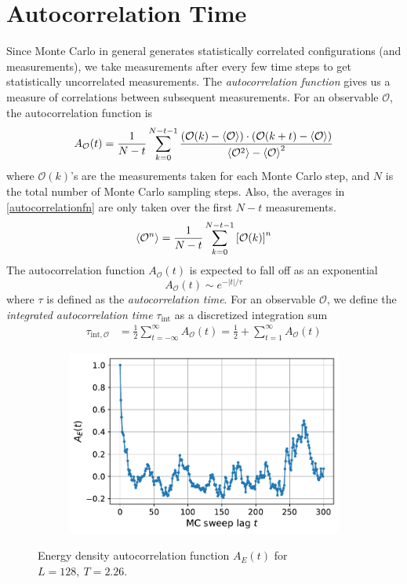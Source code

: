 \documentclass[../journal_main.tex]{subfiles}
\begin{document}
\section{Autocorrelation Time}
Since Monte Carlo in general generates statistically correlated configurations (and measurements), we take measurements after every few time steps to get statistically uncorrelated measurements. The \textit{autocorrelation function} gives us a measure of correlations between subsequent measurements. For an observable $\mathcal{O}$, the autocorrelation function is
\begin{equation}
    A_\mathcal{O}(t) =   \frac{1}{N-t} \sum_{k=0}^{N-t-1}\frac{\qty(\mathcal{O}(k) - \expval{\mathcal{O}})\cdot\qty(\mathcal{O}(k+t) - \expval{\mathcal{O}})}{\expval{\mathcal{O}^2} - \expval{\mathcal{O}}^2}
    \label{autocorrelationfn}
\end{equation}  
where $\mathcal{O}(k)$'s are the measurements taken for each Monte Carlo step, and $N$ is the total number of Monte Carlo sampling steps. Also, the averages in \eqref{autocorrelationfn} are only taken over the first $N-t$ measurements. 
\[
    \expval{\mathcal{O}^n} = \frac{1}{N-t} \sum_{k=0}^{N-t-1} \qty[\mathcal{O}(k)]^n
\]   
The autocorrelation function $A_\mathcal{O}(t)$ is expected to fall off as an exponential 
\[
    A_\mathcal{O}(t) \sim e^{-|t|/\tau }
\] 
where $\tau $ is defined as the \textit{autocorrelation time}. For an observable $\mathcal{O}$, we define the \textit{integrated autocorrelation time} $\tau_\text{int}$ as a discretized integration sum
\begin{align}
    \tau _{\text{int},\mathcal{O}} & = \frac{1}{2} \sum_{t= -\infty}^{\infty} A_\mathcal{O}(t) \nonumber = \frac{1}{2} + \sum_{t=1}^{\infty} A_\mathcal{O}(t) \label{autocorsum}
\end{align}   

\begin{figure}[!htb]
    \centering
    \begin{subfigure}[b]{0.47\textwidth}  %
        \centering
        \includegraphics[width=\textwidth]{images/misc/autocorrfn_CIM.pdf}
    \end{subfigure}
    \caption{Energy density autocorrelation function $A_E(t)$ for $L = 128, \: T = 2.26$.}
\end{figure}
\end{document}
